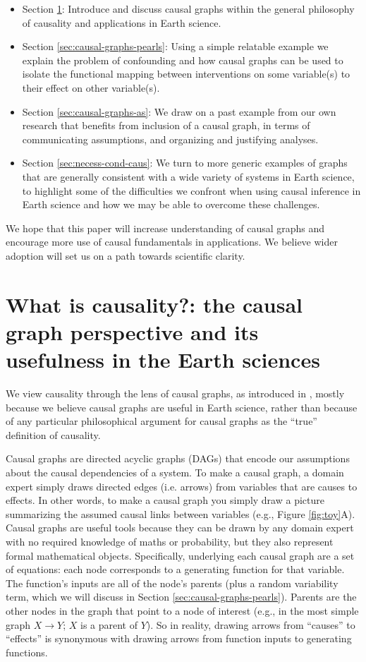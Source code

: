 \documentclass[12pt]{article}
\begin{document}
\begin{itemize}
\item Section \ref{sec:what-caus-caus}: Introduce and discuss causal
  graphs within the general philosophy of causality and applications
  in Earth science.
\item Section \ref{sec:causal-graphs-pearls}: Using a simple relatable
  example we explain the problem of confounding and how causal graphs
  can be used to isolate the functional mapping between interventions
  on some variable(s) to their effect on other variable(s).
\item Section \ref{sec:causal-graphs-as}: We draw on a past example
  from our own research that benefits from inclusion of a causal
  graph, in terms of communicating assumptions, and organizing and
  justifying analyses.
\item Section \ref{sec:necess-cond-caus}: We turn to more generic
  examples of graphs that are generally consistent with a wide variety
  of systems in Earth science, to highlight some of the difficulties
  we confront when using causal inference in Earth science and how we
  may be able to overcome these challenges.
\end{itemize}

We hope that this paper will increase understanding of causal graphs
and encourage more use of causal fundamentals in applications. We
believe wider adoption will set us on a path towards scientific
clarity.

\section{What is causality?: the causal graph perspective and its
  usefulness in the Earth sciences}\label{sec:what-caus-caus}

We view causality through the lens of causal graphs, as introduced in
\citet{pearl1995causal}, mostly because we believe causal graphs are
useful in Earth science, rather than because of any particular
philosophical argument for causal graphs as the ``true'' definition of
causality.

Causal graphs are directed acyclic graphs (DAGs) that encode our
assumptions about the causal dependencies of a system.  To make a
causal graph, a domain expert simply draws directed edges
(i.e. arrows) from variables that are causes to effects. In other
words, to make a causal graph you simply draw a picture summarizing
the assumed causal links between variables (e.g., Figure
\ref{fig:toy}A). Causal graphs are useful tools because they can be
drawn by any domain expert with no required knowledge of maths or
probability, but they also represent formal mathematical
objects. Specifically, underlying each causal graph are a set of
equations: each node corresponds to a generating function for that
variable. The function's inputs are all of the node's parents (plus a
random variability term, which we will discuss in Section
\ref{sec:causal-graphs-pearls}). Parents are the other nodes in the
graph that point to a node of interest (e.g., in the most simple graph
$X \to Y$; $X$ is a parent of $Y$). So in reality, drawing arrows from
``causes'' to ``effects'' is synonymous with drawing arrows from
function inputs to generating functions.
\end{document}
